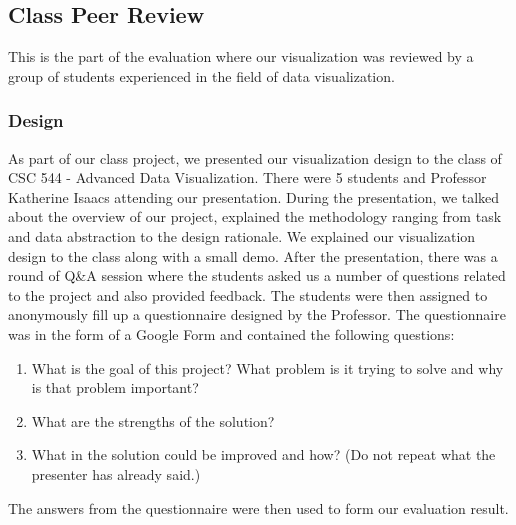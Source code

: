 \subsection{Class Peer Review}
This is the part of the evaluation where our visualization was reviewed by a group of students experienced in the field of data visualization.
\subsubsection{Design}
As part of our class project, we presented our visualization design to the class of CSC 544 - Advanced Data Visualization. There were 5 students and Professor Katherine Isaacs attending our presentation. During the presentation, we talked about the overview of our project, explained the methodology ranging from task and data abstraction to the design rationale. We explained our visualization design to the class along with a small demo. After the presentation, there was a round of Q\&A session where the students asked us a number of questions related to the project and also provided feedback. The students were then assigned to anonymously fill up a questionnaire designed by the Professor. The questionnaire was in the form of a Google Form and contained the following questions:
\begin{enumerate}
	\item What is the goal of this project? What problem is it trying to solve and why is that problem important?
	\item What are the strengths of the solution?
	\item What in the solution could be improved and how? (Do not repeat what the presenter has already said.)
\end{enumerate}
The answers from the questionnaire were then used to form our evaluation result.
